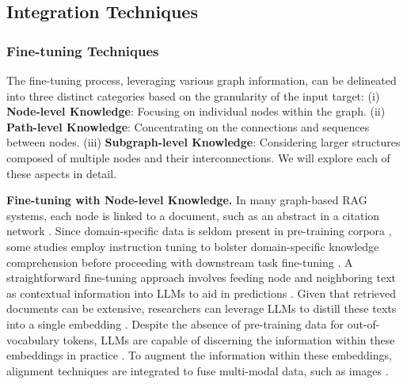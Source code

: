 \documentclass[lettersize,journal]{IEEEtran}
\begin{document}
\subsection{Integration Techniques}

\subsubsection{Fine-tuning Techniques}
The fine-tuning process, leveraging various graph information, can be delineated into three distinct categories based on the granularity of the input target:
(i) \textbf{Node-level Knowledge}: Focusing on individual nodes within the graph.
(ii) \textbf{Path-level Knowledge}: Concentrating on the connections and sequences between nodes.
(iii) \textbf{Subgraph-level Knowledge}: Considering larger structures composed of multiple nodes and their interconnections.
We will explore each of these aspects in detail.


\noindent\textbf{Fine-tuning with Node-level Knowledge.}
In many graph-based RAG systems, each node is linked to a document, such as an abstract in a citation network \cite{huang2024can}. Since domain-specific data is seldom present in pre-training corpora \cite{deng2024k2}, some studies employ instruction tuning to bolster domain-specific knowledge comprehension before proceeding with downstream task fine-tuning \cite{li2023chatdoctor, wu2024pmc}. A straightforward fine-tuning approach involves feeding node and neighboring text as contextual information into LLMs to aid in predictions \cite{fatehkia2024t, dehghan2024ewek,anonymous2024large}. Given that retrieved documents can be extensive, researchers can leverage LLMs to distill these texts into a single embedding \cite{lewis2020retrieval}. Despite the absence of pre-training data for out-of-vocabulary tokens, LLMs are capable of discerning the information within these embeddings in practice \cite{zhang2024text}. To augment the information within these embeddings, alignment techniques are integrated to fuse multi-modal data, such as images \cite{tang2023graphgpt}.
\end{document}
